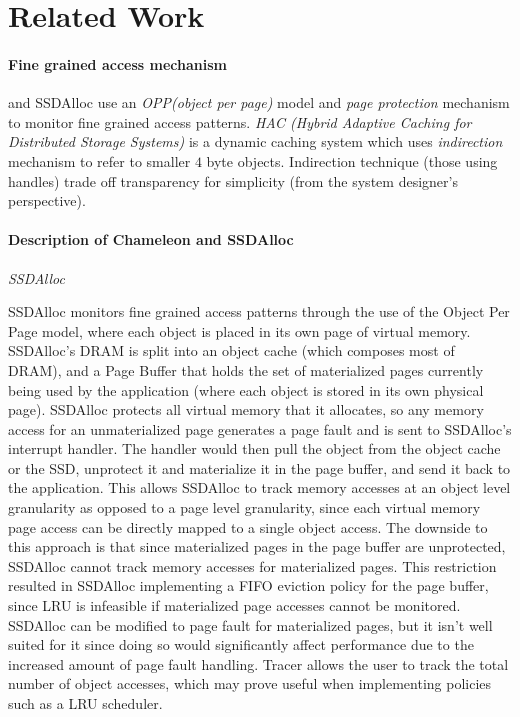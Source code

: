 \section{Related Work}
\label{sec:related}
\paragraph{Fine grained access mechanism}
{\cite{Chameleon}} and SSDAlloc {\cite{SSDAlloc}} use an {\emph{OPP(object per page)}} model and {\emph{page protection}} mechanism to monitor fine grained access patterns. {\emph{HAC (Hybrid Adaptive Caching for Distributed Storage Systems)}} {\cite{HAC}} is a dynamic caching system which uses {\emph{indirection}} mechanism to refer to smaller $4$ byte objects. Indirection technique (those using handles) trade off transparency for simplicity (from the system designer's perspective).

\paragraph{Description of Chameleon and SSDAlloc}
{\emph{SSDAlloc}}

SSDAlloc monitors fine grained access patterns through the use of the Object Per Page model, where each object is placed in its own page of virtual memory. SSDAlloc's DRAM is split into an object cache (which composes most of DRAM), and a Page Buffer that holds the set of materialized pages currently being used by the application (where each object is stored in its own physical page). SSDAlloc protects all virtual memory that it allocates, so any memory access for an unmaterialized page generates a page fault and is sent to SSDAlloc's interrupt handler. The handler would then pull the object from the object cache or the SSD, unprotect it and materialize it in the page buffer, and send it back to the application. This allows SSDAlloc to track memory accesses at an object level granularity as opposed to a page level granularity, since each virtual memory page access can be directly mapped to a single object access. The downside to this approach is that since materialized pages in the page buffer are unprotected, SSDAlloc cannot track memory accesses for materialized pages. This restriction resulted in SSDAlloc implementing a FIFO eviction policy for the page buffer, since LRU is infeasible if materialized page accesses cannot be monitored. SSDAlloc can be modified to page fault for materialized pages, but it isn't well suited for it since doing so would significantly affect performance due to the increased amount of page fault handling. Tracer allows the user to track the total number of object accesses, which may prove useful when implementing policies such as a LRU scheduler.

